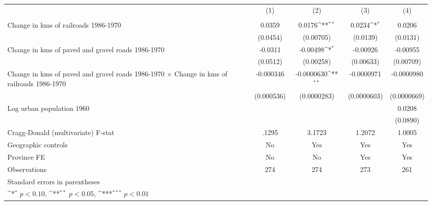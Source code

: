 {
\def\sym#1{\ifmmode^{#1}\else\(^{#1}\)\fi}
\begin{tabular}{l*{4}{c}}
\hline\hline
                &\multicolumn{1}{c}{(1)}&\multicolumn{1}{c}{(2)}&\multicolumn{1}{c}{(3)}&\multicolumn{1}{c}{(4)}\\
                &\multicolumn{1}{c}{}&\multicolumn{1}{c}{}&\multicolumn{1}{c}{}&\multicolumn{1}{c}{}\\
\hline
Change in kms of railroads 1986-1970&   0.0359         &   0.0176\sym{**} &   0.0234\sym{*}  &   0.0206         \\
                & (0.0454)         &(0.00705)         & (0.0139)         & (0.0131)         \\
[1em]
Change in kms of paved and gravel roads 1986-1970&  -0.0311         & -0.00498\sym{*}  & -0.00926         & -0.00955         \\
                & (0.0512)         &(0.00258)         &(0.00633)         &(0.00709)         \\
[1em]
Change in kms of paved and gravel roads 1986-1970 $\times$ Change in kms of railroads 1986-1970&-0.000346         &-0.0000630\sym{**} &-0.0000971         &-0.0000980         \\
                &(0.000536)         &(0.0000283)         &(0.0000603)         &(0.0000669)         \\
[1em]
Log urban population 1960&                  &                  &                  &   0.0208         \\
                &                  &                  &                  & (0.0890)         \\
\hline
Cragg-Donald (multivariate) F-stat&    .1295         &   3.1723         &   1.2072         &   1.0005         \\
Geographic controls&       No         &      Yes         &      Yes         &      Yes         \\
Province FE     &       No         &       No         &      Yes         &      Yes         \\
Observations    &      274         &      274         &      273         &      261         \\
\hline\hline
\multicolumn{5}{l}{\footnotesize Standard errors in parentheses}\\
\multicolumn{5}{l}{\footnotesize \sym{*} \(p<0.10\), \sym{**} \(p<0.05\), \sym{***} \(p<0.01\)}\\
\end{tabular}
}
